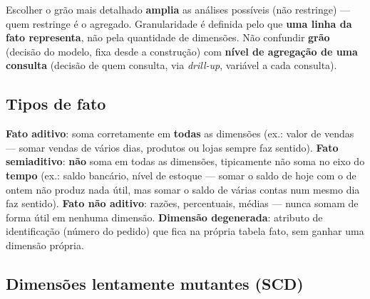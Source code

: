 \begin{cuidado}
Escolher o grão mais detalhado \textbf{amplia} as análises possíveis (não
restringe) --- quem restringe é o agregado. Granularidade é definida pelo
que \textbf{uma linha da fato representa}, não pela quantidade de
dimensões. Não confundir \textbf{grão} (decisão do modelo, fixa desde a
construção) com \textbf{nível de agregação de uma consulta} (decisão de
quem consulta, via \textit{drill-up}, variável a cada consulta).
\end{cuidado}

\subsection{Tipos de fato}

\begin{conceito}
\textbf{Fato aditivo}: soma corretamente em \textbf{todas} as dimensões
(ex.: valor de vendas --- somar vendas de vários dias, produtos ou lojas
sempre faz sentido). \textbf{Fato semiaditivo}: \textbf{não} soma em
todas as dimensões, tipicamente não soma no eixo do \textbf{tempo} (ex.:
saldo bancário, nível de estoque --- somar o saldo de hoje com o de ontem
não produz nada útil, mas somar o saldo de várias contas num mesmo dia
faz sentido). \textbf{Fato não aditivo}: razões, percentuais, médias ---
nunca somam de forma útil em nenhuma dimensão. \textbf{Dimensão
degenerada}: atributo de identificação (número do pedido) que fica na
própria tabela fato, sem ganhar uma dimensão própria.
\end{conceito}

\subsection{Dimensões lentamente mutantes (SCD)}

